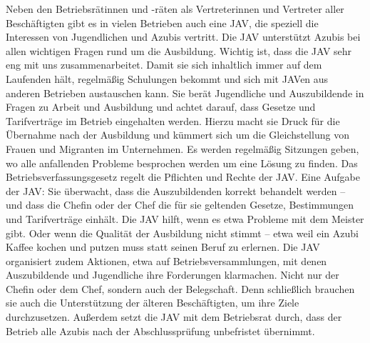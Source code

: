 Neben den Betriebsrätinnen und -räten als Vertreterinnen und Vertreter aller Beschäftigten gibt es in vielen Betrieben auch eine JAV, die speziell die Interessen von Jugendlichen und Azubis vertritt. Die JAV unterstützt Azubis bei allen wichtigen Fragen rund um die Ausbildung. Wichtig ist, dass die JAV sehr eng mit uns zusammenarbeitet. Damit sie sich inhaltlich immer auf dem Laufenden hält, regelmäßig Schulungen bekommt und sich mit JAVen aus anderen Betrieben austauschen kann.
\newline 
Sie berät Jugendliche und Auszubildende in Fragen zu Arbeit und Ausbildung und achtet darauf, dass Gesetze und Tarifverträge im Betrieb eingehalten werden. Hierzu macht sie Druck für die Übernahme nach der Ausbildung und kümmert sich um die Gleichstellung von Frauen und Migranten im Unternehmen.
Es werden regelmäßig Sitzungen geben, wo alle anfallenden Probleme besprochen werden um eine Lösung zu finden.
\newline
Das Betriebsverfassungsgesetz regelt die Pflichten und Rechte der JAV. Eine Aufgabe der JAV: Sie überwacht, dass die Auszubildenden korrekt behandelt werden – und dass die Chefin oder der Chef die für sie geltenden Gesetze, Bestimmungen und Tarifverträge einhält. Die JAV hilft, wenn es etwa Probleme mit dem Meister gibt. Oder wenn die Qualität der Ausbildung nicht stimmt – etwa weil ein Azubi Kaffee kochen und putzen muss statt seinen Beruf zu erlernen.
\newline
Die JAV organisiert zudem Aktionen, etwa auf Betriebsversammlungen, mit denen Auszubildende und Jugendliche ihre Forderungen klarmachen. Nicht nur der Chefin oder dem Chef, sondern auch der Belegschaft. Denn schließlich brauchen sie auch die Unterstützung der älteren Beschäftigten, um ihre Ziele durchzusetzen. Außerdem setzt die JAV mit dem Betriebsrat durch, dass der Betrieb alle Azubis nach der Abschlussprüfung unbefristet übernimmt.